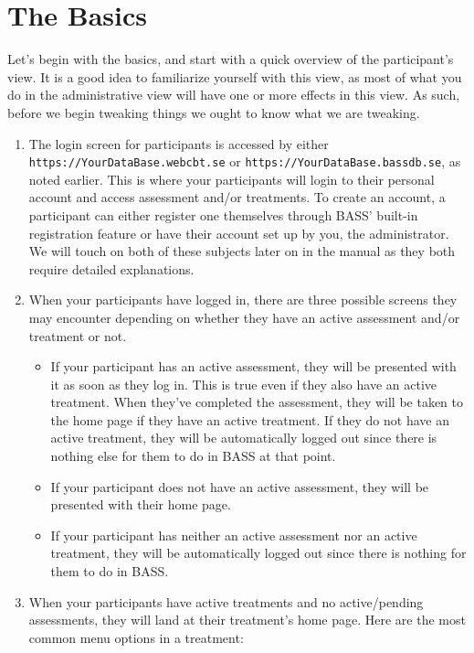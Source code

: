 \documentclass[
]{book}
\providecommand{\tightlist}{%
  \setlength{\itemsep}{0pt}\setlength{\parskip}{0pt}}
\begin{document}
\chapter{The Basics}\label{the-basics}

Let's begin with the basics, and start with a quick overview of the participant's view. It is a good idea to familiarize yourself with this view, as most of what you do in the administrative view will have one or more effects in this view. As such, before we begin tweaking things we ought to know what we are tweaking.

\begin{enumerate}
\def\labelenumi{\arabic{enumi}.}
\tightlist
\item
  The login screen for participants is accessed by either \texttt{https://YourDataBase.webcbt.se} or \texttt{https://YourDataBase.bassdb.se}, as noted earlier. This is where your participants will login to their personal account and access assessment and/or treatments. To create an account, a participant can either register one themselves through BASS' built-in registration feature or have their account set up by you, the administrator. We will touch on both of these subjects later on in the manual as they both require detailed explanations.
\item
  When your participants have logged in, there are three possible screens they may encounter depending on whether they have an active assessment and/or treatment or not.

  \begin{itemize}
  \tightlist
  \item
    If your participant has an active assessment, they will be presented with it as soon as they log in. This is true even if they also have an active treatment. When they've completed the assessment, they will be taken to the home page if they have an active treatment. If they do not have an active treatment, they will be automatically logged out since there is nothing else for them to do in BASS at that point.
  \item
    If your participant does not have an active assessment, they will be presented with their home page.
  \item
    If your participant has neither an active assessment nor an active treatment, they will be automatically logged out since there is nothing for them to do in BASS.
  \end{itemize}
\item
  When your participants have active treatments and no active/pending assessments, they will land at their treatment's home page. Here are the most common menu options in a treatment:


\end{enumerate}
\end{document}
